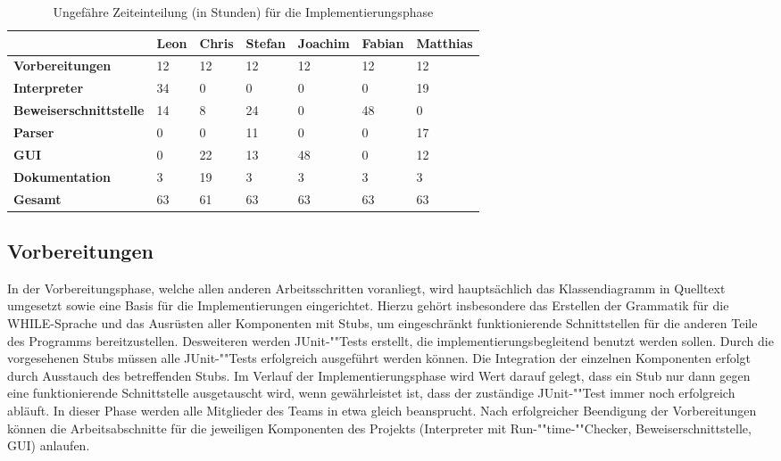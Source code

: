\begin{figure}
	\label{gantt_impl}
\end{figure}

\begin{table}[H]
	\caption[B]{Ungefähre Zeiteinteilung (in Stunden) für die Implementierungsphase}
	\label{timeplan}
	\begin{tabular}{|l|l|l|l|l|l|l|}
		\hline
		 & \textbf{Leon} & \textbf{Chris} & \textbf{Stefan} & \textbf{Joachim} & \textbf{Fabian} & \textbf{Matthias} \\
		\hline
		\textbf{Vorbereitungen} & 12 & 12 & 12 & 12 & 12 & 12 \\
		\hline
		\textbf{Interpreter} & 34 & 0 & 0 & 0 & 0 & 19 \\
		\hline
		\textbf{Beweiserschnittstelle} & 14 & 8 & 24 & 0 & 48 & 0 \\
		\hline
		\textbf{Parser} & 0 & 0 & 11 & 0 & 0 & 17 \\
		\hline
		\textbf{GUI} & 0 & 22 & 13 & 48 & 0 & 12 \\
		\hline
		\textbf{Dokumentation} & 3 & 19 & 3 & 3 & 3 & 3 \\
		\hline
		\textbf{Gesamt}	& 63 & 61 & 63 & 63 & 63 & 63 \\
		\hline
	\end{tabular}
\end{table}

\subsection{Vorbereitungen}
In der Vorbereitungsphase, welche allen anderen Arbeitsschritten voranliegt, wird hauptsächlich das Klassendiagramm in Quelltext umgesetzt sowie eine Basis für die Implementierungen eingerichtet. Hierzu gehört insbesondere das Erstellen der Grammatik für die WHILE-Sprache und das Ausrüsten aller Komponenten mit Stubs, um eingeschränkt funktionierende Schnittstellen für die anderen Teile des Programms bereitzustellen. Desweiteren werden JUnit-""Tests erstellt, die implementierungsbegleitend benutzt werden sollen. Durch die vorgesehenen Stubs müssen alle JUnit-""Tests erfolgreich ausgeführt werden können. Die Integration der einzelnen Komponenten erfolgt durch Ausstauch des betreffenden Stubs. Im Verlauf der Implementierungsphase wird Wert darauf gelegt, dass ein Stub nur dann gegen eine funktionierende Schnittstelle ausgetauscht wird, wenn gewährleistet ist, dass der zuständige JUnit-""Test immer noch erfolgreich abläuft. In dieser Phase werden alle Mitglieder des Teams in etwa gleich beansprucht. Nach erfolgreicher Beendigung der Vorbereitungen können die Arbeitsabschnitte für die jeweiligen Komponenten des Projekts (Interpreter mit Run-""time-""Checker, Beweiserschnittstelle, GUI) anlaufen.

